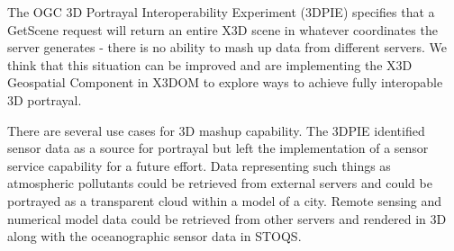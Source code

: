 \documentclass[annualconference]{acmsiggraph}  %
\begin{document}
The OGC 3D Portrayal Interoperability Experiment (3DPIE) \cite{3DPIE} specifies that a GetScene request will return an entire X3D scene in whatever coordinates the server generates - there is no ability to mash up data from different servers. We think that this situation can be improved and are implementing the X3D Geospatial Component in X3DOM to explore ways to achieve fully interopable 3D portrayal.

There are several use cases for 3D mashup capability. The 3DPIE identified sensor data as a source for portrayal but left the implementation of a sensor service capability for a future effort. Data representing such things as atmospheric pollutants could be retrieved from external servers and could be portrayed as a transparent cloud within a model of a city. 
Remote sensing and numerical model data could be retrieved from other servers and rendered in 3D along with the oceanographic sensor data in STOQS.



\nocite{*}

\end{document}
